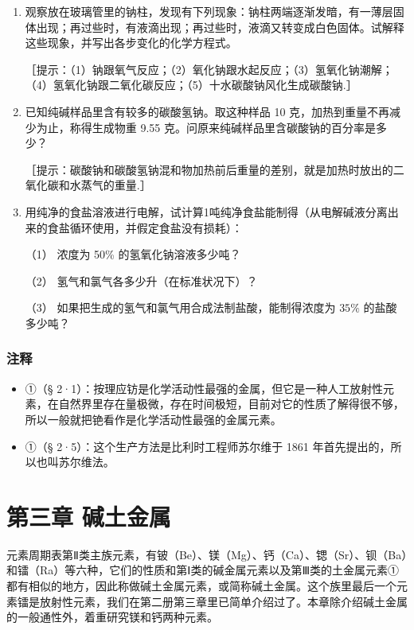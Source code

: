 \begin{enumerate}[start=5,label={*\arabic*.}]
\item
  观察放在玻璃管里的钠柱，发现有下列现象：钠柱两端逐渐发暗，有一薄层固体出现；再过些时，有液滴出现；再过些时，液滴又转变成白色固体。试解释这些现象，并写出各步变化的化学方程式。

［提示：（1）钠跟氧气反应；（2）氧化钠跟水起反应；（3）氢氧化钠潮解；（4）氢氧化钠跟二氧化碳反应；（5）十水碳酸钠风化生成碳酸钠.］

\item
  已知纯碱样品里含有较多的碳酸氢钠。取这种样品 10
克，加热到重量不再减少为止，称得生成物重 9.55
克。问原来纯碱样品里含碳酸钠的百分率是多少？

［提示：碳酸钠和碳酸氢钠混和物加热前后重量的差别，就是加热时放出的二氧化碳和水蒸气的重量.］

\item
  用纯净的食盐溶液进行电解，试计算1吨纯净食盐能制得（从电解碱液分离出来的食盐循环使用，并假定食盐没有损耗）：

（1） 浓度为 50\% 的氢氧化钠溶液多少吨？

（2） 氢气和氯气各多少升（在标准状况下）？

（3） 如果把生成的氢气和氯气用合成法制盐酸，能制得浓度为 \(35 \%\)
的盐酸多少吨？

\end{enumerate}
\subsection{注释}

\begin{itemize}
\item
  ①（§
  2·1）：按理应钫是化学活动性最强的金属，但它是一种人工放射性元素，在自然界里存在量极微，存在时间极短，目前对它的性质了解得很不够，所以一般就把铯看作是化学活动性最强的金属元素。
\item
  ①（§ 2·5）：这个生产方法是比利时工程师苏尔维于 1861
  年首先提出的，所以也叫苏尔维法。
\end{itemize}

\chapter{第三章 碱土金属}

元素周期表第Ⅱ类主族元素，有铍（Be）、镁（Mg）、钙（Ca）、锶（Sr）、钡（Ba）和镭（Ra）等六种，它们的性质和第Ⅰ类的碱金属元素以及第Ⅲ类的土金属元素①都有相似的地方，因此称做碱土金属元素，或简称碱土金属。这个族里最后一个元素镭是放射性元素，我们在第二册第三章里已简单介绍过了。本章除介绍碱土金属的一般通性外，着重研究镁和钙两种元素。

